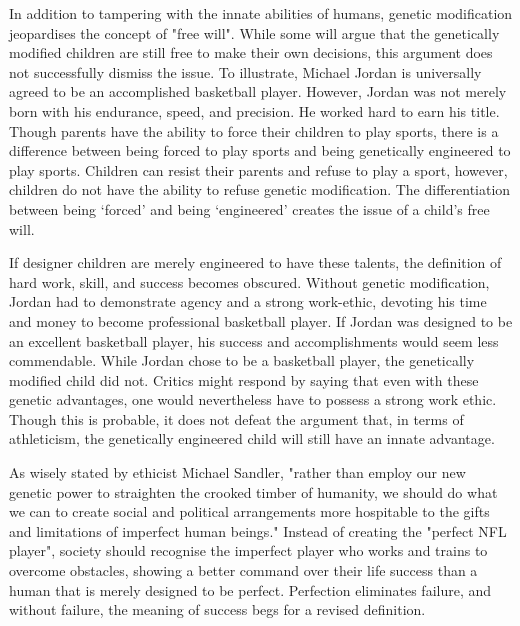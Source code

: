    In addition to tampering with the innate abilities of humans, genetic
   modification jeopardises the concept of "free will".  While some will
   argue that the genetically modified children are still free to make
   their own decisions, this argument does not successfully dismiss the
   issue. To illustrate, Michael Jordan is universally agreed to be an
   accomplished basketball player. However, Jordan was not merely born
   with his endurance, speed, and precision. He worked hard to earn his
   title. Though parents have the ability to force their children to play
   sports, there is a difference between being forced to play sports and
   being genetically engineered to play sports. Children can resist their
   parents and refuse to play a sport, however, children do not have the
   ability to refuse genetic modification. The differentiation between
   being `forced' and being `engineered' creates the issue of a child's
   free will.

   If designer children are merely engineered to have these talents, the
   definition of hard work, skill, and success becomes obscured. Without
   genetic modification, Jordan had to demonstrate agency and a strong
   work-ethic, devoting his time and money to become professional
   basketball player. If Jordan was designed to be an excellent basketball
   player, his success and accomplishments would seem less commendable.
   While Jordan chose to be a basketball player, the genetically modified
   child did not. Critics might respond by saying that even with these
   genetic advantages, one would nevertheless have to possess a strong
   work ethic. Though this is probable, it does not defeat the argument
   that, in terms of athleticism, the genetically engineered child will
   still have an innate advantage.

   As wisely stated by ethicist Michael Sandler, "rather than employ our
   new genetic power to straighten the crooked timber of humanity, we
   should do what we can to create social and political arrangements more
   hospitable to the gifts and limitations of imperfect human beings."
   Instead of creating the "perfect NFL player", society should recognise
   the imperfect player who works and trains to overcome obstacles,
   showing a better command over their life success than a human that is
   merely designed to be perfect. Perfection eliminates failure, and
   without failure, the meaning of success begs for a revised definition.

